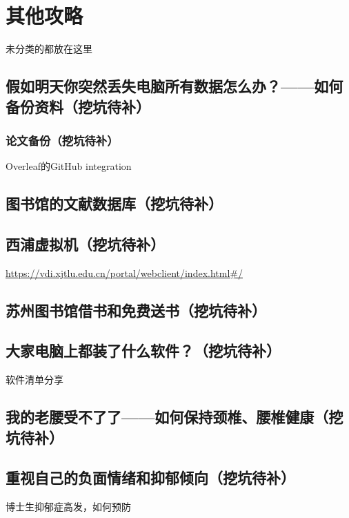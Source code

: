 
\chapter{其他攻略}

未分类的都放在这里

\section{假如明天你突然丢失电脑所有数据怎么办？——如何备份资料（挖坑待补）}
\subsection{论文备份（挖坑待补）}
Overleaf的GitHub integration
\section{图书馆的文献数据库（挖坑待补）}

\section{西浦虚拟机（挖坑待补）}
\url{https://vdi.xjtlu.edu.cn/portal/webclient/index.html#/}
\section{苏州图书馆借书和免费送书（挖坑待补）}
\section{大家电脑上都装了什么软件？（挖坑待补）}
软件清单分享
\section{我的老腰受不了了——如何保持颈椎、腰椎健康（挖坑待补）}
\section{重视自己的负面情绪和抑郁倾向（挖坑待补）}
博士生抑郁症高发，如何预防
